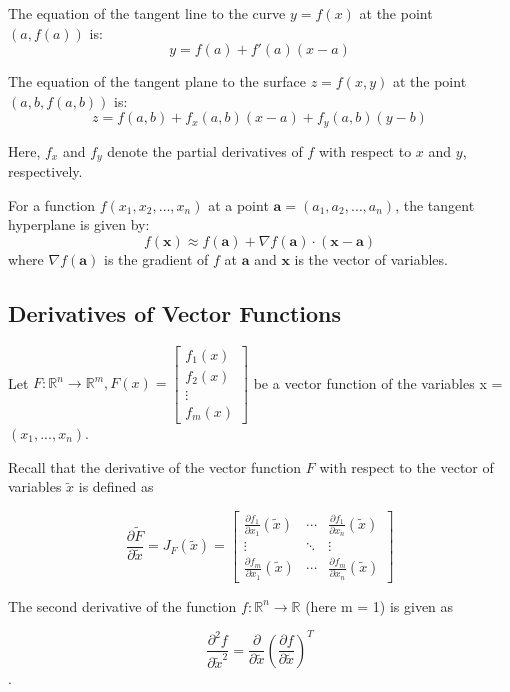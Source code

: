 \documentclass{article}
\begin{document}
\begin{multicols}{2}
	The equation of the tangent line to the curve \( y = f(x) \) at the point \( (a, f(a)) \) is:
	\[
		y = f(a) + f'(a)(x - a)
	\]

	The equation of the tangent plane to the surface \( z = f(x, y) \) at the point \( (a, b, f(a, b)) \) is:
	\[
		z = f(a, b) + f_x(a, b)(x - a) + f_y(a, b)(y - b)
	\]

	Here, \( f_x \) and \( f_y \) denote the partial derivatives of \( f \) with respect to \( x \) and \( y \), respectively.

	For a function \( f(x_1, x_2, \ldots, x_n) \) at a point \( \mathbf{a} = (a_1, a_2, \ldots, a_n) \), the tangent hyperplane is given by:
	\[
		f(\mathbf{x}) \approx f(\mathbf{a}) + \nabla f(\mathbf{a}) \cdot (\mathbf{x} - \mathbf{a})
	\]
	where \( \nabla f(\mathbf{a}) \) is the gradient of \( f \) at \( \mathbf{a} \) and \( \mathbf{x} \) is the vector of variables.

	\subsection{Derivatives of Vector Functions}
	Let \( F: \mathbb{R}^n \rightarrow \mathbb{R}^m, F(x) =
	\begin{bmatrix}
		f_1(x) \\
		f_2(x) \\
		\vdots \\
		f_m(x)
	\end{bmatrix} \)
	be a vector function of the variables x = \( (x_1, ..., x_n) \).

	Recall that the derivative of the vector function \( F \) with respect to the vector of variables \( \tilde{x} \) is defined as

	\[ \frac{\partial \tilde{F}}{\partial \tilde{x}} = J_F(\tilde{x}) = \begin{bmatrix}    \frac{\partial f_1}{\partial x_1} (\tilde{x}) & \cdots & \frac{\partial f_1}{\partial x_n} (\tilde{x}) \\    \vdots & \ddots & \vdots \\    \frac{\partial f_m}{\partial x_1} (\tilde{x}) & \cdots & \frac{\partial f_m}{\partial x_n} (\tilde{x})\end{bmatrix}\]

	The second derivative of the function \( f: \mathbb{R}^n \rightarrow \mathbb{R} \) (here m = 1) is given as

	\[ \frac{\partial^2 f}{\partial \tilde{x}^2} = \frac{\partial}{\partial \tilde{x}} \left( \frac{\partial f}{\partial \tilde{x}} \right)^T \].


\end{multicols}
\end{document}
